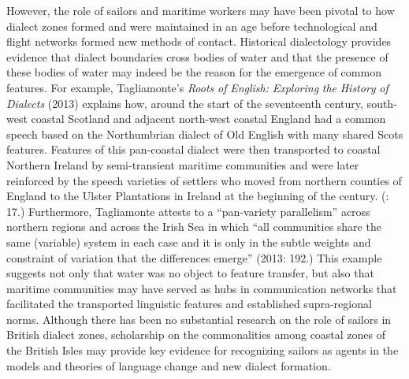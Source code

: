   However, the role of sailors and maritime workers may have been pivotal to how dialect zones formed and were maintained in an age before technological and flight networks formed new methods of contact. Historical dialectology provides evidence that dialect boundaries cross bodies of water and that the presence of these bodies of water may indeed be the reason for the emergence of common features. For example, Tagliamonte’s \textit{Roots} \textit{of} \textit{English:} \textit{Exploring} \textit{the} \textit{History} \textit{of} \textit{Dialects} (2013) explains how, around the start of the seventeenth century, south-west coastal Scotland and adjacent north-west coastal England had a common speech based on the Northumbrian dialect of Old English with many shared Scots features. Features of this pan-coastal dialect were then transported to coastal Northern Ireland by semi-transient maritime communities and were later reinforced by the speech varieties of settlers who moved from northern counties of England to the Ulster Plantations in Ireland at the beginning of the century. (\citealt{Tagliamonte2013}: 17.) Furthermore, Tagliamonte attests to a “pan-variety parallelism” across northern regions and across the Irish Sea in which “all communities share the same (variable) system in each case and it is only in the subtle weights and constraint of variation that the differences emerge” (2013: 192.) This example suggests not only that water was no object to feature transfer, but also that maritime communities may have served as hubs in communication networks that facilitated the transported linguistic features and established supra-regional norms. Although there has been no substantial research on the role of sailors in British dialect zones, scholarship on the commonalities among coastal zones of the British Isles may provide key evidence for recognizing sailors as agents in the models and theories of language change and new dialect formation. 

